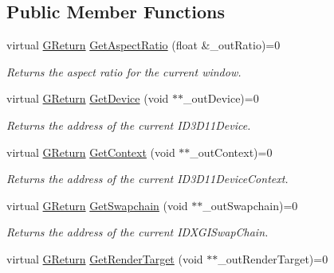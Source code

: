 \subsection*{Public Member Functions}
\begin{DoxyCompactItemize}
\item 
virtual \mbox{\hyperlink{namespace_g_w_a67a839e3df7ea8a5c5686613a7a3de21}{G\+Return}} \mbox{\hyperlink{class_g_w_1_1_g_r_a_p_h_i_c_s_1_1_g_direct_x11_surface_a4ae8372993803025a14a8471835ed231}{Get\+Aspect\+Ratio}} (float \&\+\_\+out\+Ratio)=0
\begin{DoxyCompactList}\small\item\em Returns the aspect ratio for the current window. \end{DoxyCompactList}\item 
virtual \mbox{\hyperlink{namespace_g_w_a67a839e3df7ea8a5c5686613a7a3de21}{G\+Return}} \mbox{\hyperlink{class_g_w_1_1_g_r_a_p_h_i_c_s_1_1_g_direct_x11_surface_a076c4f3a07f79f578185416be449ebd2}{Get\+Device}} (void $\ast$$\ast$\+\_\+out\+Device)=0
\begin{DoxyCompactList}\small\item\em Returns the address of the current I\+D3\+D11\+Device. \end{DoxyCompactList}\item 
virtual \mbox{\hyperlink{namespace_g_w_a67a839e3df7ea8a5c5686613a7a3de21}{G\+Return}} \mbox{\hyperlink{class_g_w_1_1_g_r_a_p_h_i_c_s_1_1_g_direct_x11_surface_aceaa2e22cbdee6c651cf2045d9320041}{Get\+Context}} (void $\ast$$\ast$\+\_\+out\+Context)=0
\begin{DoxyCompactList}\small\item\em Returns the address of the current I\+D3\+D11\+Device\+Context. \end{DoxyCompactList}\item 
virtual \mbox{\hyperlink{namespace_g_w_a67a839e3df7ea8a5c5686613a7a3de21}{G\+Return}} \mbox{\hyperlink{class_g_w_1_1_g_r_a_p_h_i_c_s_1_1_g_direct_x11_surface_a8388438c79a82a10f595e10b0bbaab2c}{Get\+Swapchain}} (void $\ast$$\ast$\+\_\+out\+Swapchain)=0
\begin{DoxyCompactList}\small\item\em Returns the address of the current I\+D\+X\+G\+I\+Swap\+Chain. \end{DoxyCompactList}\item 
virtual \mbox{\hyperlink{namespace_g_w_a67a839e3df7ea8a5c5686613a7a3de21}{G\+Return}} \mbox{\hyperlink{class_g_w_1_1_g_r_a_p_h_i_c_s_1_1_g_direct_x11_surface_a953f4809860408b0e99928ac8b9b6a53}{Get\+Render\+Target}} (void $\ast$$\ast$\+\_\+out\+Render\+Target)=0

\end{DoxyCompactItemize}

